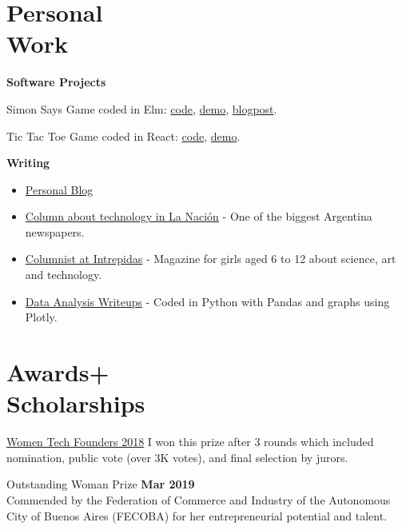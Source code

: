 \documentclass[margin,line]{resume}
\begin{document}
\begin{resume}
\section{\mysidestyle Personal\\Work}

\textbf{Software Projects}
\begin{list2}

\item Simon Says Game coded in Elm: \href{https://github.com/carohadad/simon-elm}{code}, \href{https://carohadad.github.io/simon-elm/}{demo}, \href{https://medium.com/@carohadad/mi-primer-programa-en-elm-574ce6a445c3}{blogpost}.

\item Tic Tac Toe Game coded in React: \href{https://github.com/carohadad/tic-tac-toe-react}{code}, \href{https://carohadad.github.io/tic-tac-toe-react/}{demo}.

\end{list2}

\textbf{Writing}
\begin{itemize}
\item \href{https://medium.com/@carohadad} {Personal Blog}
\item \href{http://www.lanacion.com.ar/autor/carolina-hadad-10522} {Column about technology in La Naci\'on} - One of the biggest Argentina newspapers.
\item \href{https://www.intrepidas.com.ar/} {Columnist at Intrepidas} - Magazine for girls aged 6 to 12 about science, art and technology.
\item \href{https://bit.ly/data-anal-python} {Data Analysis Writeups} - Coded in Python with Pandas and graphs using Plotly.
\end{itemize}




\section{\mysidestyle Awards+\\Scholarships}

\begin{list2}
\item \href{https://womentechfounders.com/2018-award-winners/}{Women Tech Founders 2018} I won this prize after 3 rounds which included nomination, public vote (over 3K votes), and final selection by jurors.

\item Outstanding Woman Prize
 \hfill \textbf{Mar 2019} \\
Commended by the Federation of Commerce and Industry of the Autonomous City of Buenos Aires (FECOBA) for her entrepreneurial potential and talent.


\end{list2}
\end{resume}
\end{document}
